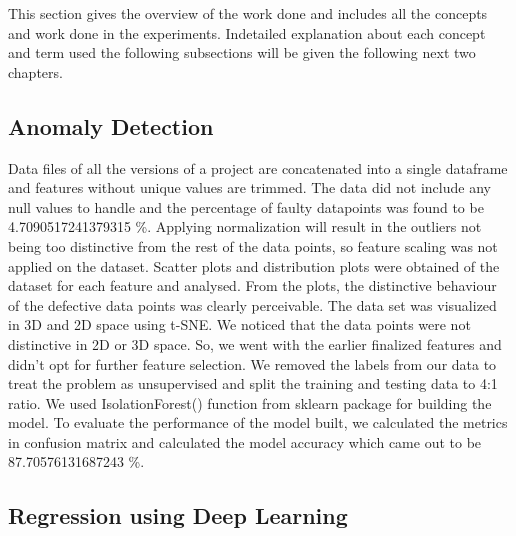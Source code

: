 This section gives the overview of the work done and includes all the concepts and work done in the experiments. Indetailed explanation about each concept and term used the following subsections will be given the following next two chapters. 

\subsection{Anomaly Detection}
Data files of all the versions of a project are concatenated into a single dataframe and features without unique values are trimmed. The data did not include any null values to handle and the percentage of faulty datapoints was found to be 4.7090517241379315 \%. Applying normalization will result in the outliers not being too distinctive from the rest of the data points, so feature scaling was not applied on the dataset. Scatter plots and distribution plots were obtained of the dataset for each feature and analysed. From the plots, the distinctive behaviour of the defective data points was clearly perceivable. The data set was visualized in 3D and 2D space using t-SNE. We noticed that the data points were not distinctive in 2D or 3D space. So, we went with the earlier finalized features and didn't opt for further feature selection. We removed the labels from our data to treat the problem as unsupervised and split the training and testing data to 4:1 ratio. We used IsolationForest() function from sklearn package for building the model. To evaluate the performance of the model built, we calculated the metrics in confusion matrix and calculated the model accuracy which came out to be 87.70576131687243 \%. 

\subsection{Regression using Deep Learning}

